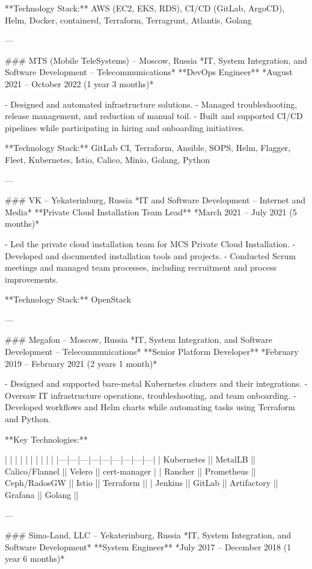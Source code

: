 **Technology Stack:** AWS (EC2, EKS, RDS), CI/CD (GitLab, ArgoCD), Helm, Docker, containerd, Terraform, Terragrunt, Atlantis, Golang

---

### MTS (Mobile TeleSystems) – Moscow, Russia  
*IT, System Integration, and Software Development – Telecommunications*  
**DevOps Engineer**  
*August 2021 – October 2022 (1 year 3 months)*

- Designed and automated infrastructure solutions.
- Managed troubleshooting, release management, and reduction of manual toil.
- Built and supported CI/CD pipelines while participating in hiring and onboarding initiatives.

**Technology Stack:** GitLab CI, Terraform, Ansible, SOPS, Helm, Flagger, Fleet, Kubernetes, Istio, Calico, Minio, Golang, Python

---

### VK – Yekaterinburg, Russia  
*IT and Software Development – Internet and Media*  
**Private Cloud Installation Team Lead**  
*March 2021 – July 2021 (5 months)*

- Led the private cloud installation team for MCS Private Cloud Installation.
- Developed and documented installation tools and projects.
- Conducted Scrum meetings and managed team processes, including recruitment and process improvements.

**Technology Stack:** OpenStack

---

### Megafon – Moscow, Russia  
*IT, System Integration, and Software Development – Telecommunications*  
**Senior Platform Developer**  
*February 2019 – February 2021 (2 years 1 month)*

- Designed and supported bare-metal Kubernetes clusters and their integrations.
- Oversaw IT infrastructure operations, troubleshooting, and team onboarding.
- Developed workflows and Helm charts while automating tasks using Terraform and Python.

**Key Technologies:**

|   |   |   |   |   |   |   |   |   |
|---|---|---|---|---|---|---|---|---|
| Kubernetes    || MetalLB || Calico/Flannel || Velero || cert-manager |
| Rancher || Prometheus || Ceph/RadosGW || Istio || Terraform ||
| Jenkins || GitLab || Artifactory || Grafana || Golang ||

---

### Sima-Land, LLC – Yekaterinburg, Russia  
*IT, System Integration, and Software Development*  
**System Engineer**  
*July 2017 – December 2018 (1 year 6 months)*

